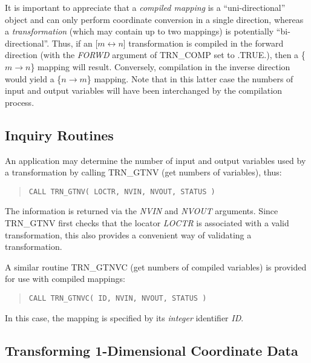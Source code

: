\documentclass[twoside,11pt]{article}
\newcommand{\xlabel}[1]{}
\newcommand{\name}[1]{\mbox{\small{#1}}}
\newcommand{\fortvar}[1]{\mbox{\emph{#1}}}
\begin{document}
It is important to appreciate that a \emph{compiled mapping} is a
``uni-directional'' object and can only perform coordinate conversion in a
single direction, whereas a \emph{transformation} (which may contain up to
two mappings) is potentially ``bi-directional''. 
Thus, if an [$m \leftrightarrow n$] transformation is compiled in the
forward direction (with the \fortvar{FORWD} argument of \name{TRN\_COMP} set
to \name{.TRUE.}), then a \mbox{\{$m \rightarrow n$\}} mapping will result. 
Conversely, compilation in the inverse direction would yield a \mbox{\{$n
\rightarrow m$\}} mapping. 
Note that in this latter case the numbers of input and output variables will
have been interchanged by the compilation process. 


\subsection{\xlabel{inquiry_routines}Inquiry Routines}

An application may determine the number of input and output variables
used by a transformation by calling \name{TRN\_GTNV} (get numbers of
variables), thus:

\begin{quote}
\begin{verbatim}
CALL TRN_GTNV( LOCTR, NVIN, NVOUT, STATUS )
\end{verbatim}
\end{quote}

The information is returned via the \fortvar{NVIN} and \fortvar{NVOUT}
arguments. 
Since \name{TRN\_GTNV} first checks that the locator \fortvar{LOCTR} is
associated with a valid transformation, this also provides a convenient way
of validating a transformation. 

A similar routine \name{TRN\_GTNVC} (get numbers of compiled variables) is
provided for use with compiled mappings: 

\begin{quote}
\begin{verbatim}
CALL TRN_GTNVC( ID, NVIN, NVOUT, STATUS )
\end{verbatim}
\end{quote}

In this case, the mapping is specified by its \emph{integer} identifier
\fortvar{ID}. 


\subsection{\xlabel{transforming_1dimensional_coordinate_data}Transforming 1-Dimensional Coordinate Data}
\end{document}
